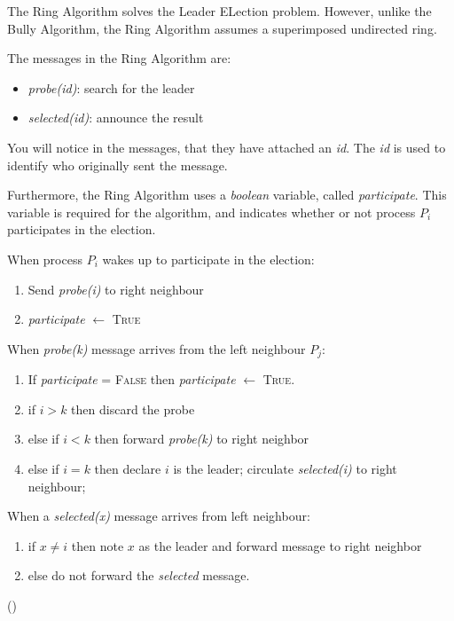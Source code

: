 \documentclass{report}
\begin{document}
The Ring Algorithm solves the Leader ELection problem. However, unlike the Bully Algorithm, the Ring Algorithm assumes a superimposed undirected ring.

The messages in the Ring Algorithm are:
\begin{itemize}
  \item \textit{probe(id)}: search for the leader
  \item \textit{selected(id)}: announce the result
\end{itemize}

You will notice in the messages, that they have attached an \textit{id}. The \textit{id} is used to identify who originally sent the message.

Furthermore, the Ring Algorithm uses a \textit{boolean} variable, called \textit{participate}. This variable is required for the algorithm, and indicates whether or not process $P_{i}$ participates in the election.

\noindent
When process $P_{i}$ wakes up to participate in the election:
\begin{enumerate}
  \item Send \textit{probe(i)} to right neighbour
        \item \textit{participate } $\leftarrow $ \textsc{True}
\end{enumerate}

\noindent
When \textit{probe(k)} message arrives from the left neighbour $P_{j}$:
\begin{enumerate}
  \item If \textit{participate} = \textsc{False} then \textit{participate} $\leftarrow$ \textsc{True}.
  \item if $i > k$ then discard the probe
  \item else if $i < k$ then forward \textit{probe(k)} to right neighbor
  \item else if $i = k$ then declare $i$ is the leader; circulate \textit{selected(i)} to right neighbour;
\end{enumerate}

\noindent
When a \textit{selected(x)} message arrives from left neighbour:
\begin{enumerate}
  \item if $x \neq i$ then note $x$ as the leader and forward message to right neighbor
        \item else do not forward the \textit{selected} message.
\end{enumerate}
(\cite{kshemkalyani2011distributed})
\end{document}
